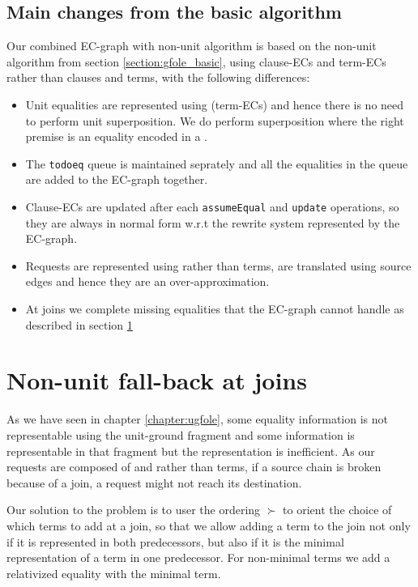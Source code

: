 \bigskip 

\subsection*{Main changes from the basic algorithm}
Our combined EC-graph with non-unit algorithm is based on the non-unit algorithm from section \ref{section:gfole_basic}, using clause-ECs and term-ECs rather than clauses and terms, with the following differences:
\begin{itemize}
	\item Unit equalities are represented using \GTs{} (term-ECs) and hence there is no need to perform unit superposition. 
	We do perform superposition where the right premise is an equality encoded in a \GT{}.
	\item The \lstinline|todoeq| queue is maintained seprately and all the equalities in the queue are added to the EC-graph together.
	\item Clause-ECs are updated after each \lstinline|assumeEqual| and \lstinline|update| operations, so they are always in normal form w.r.t the rewrite system represented by the EC-graph.
	\item Requests are represented using \GFAs{} rather than terms, are translated using source edges and hence they are an over-approximation.
	\item At joins we complete missing equalities that the EC-graph cannot handle as described in section \ref{section:gfole:EC-graphs:non_unit_fallback}
\end{itemize}

\section{Non-unit fall-back at joins}\label{section:gfole:EC-graphs:non_unit_fallback}
As we have seen in chapter \ref{chapter:ugfole}, some equality information is not representable using the unit-ground fragment and some information is representable in that fragment but the representation is inefficient. As our requests are composed of \GFAs{} and \GTs{} rather than terms, if a source chain is broken because of a join, a request might not reach its destination.

Our solution to the problem is to user the ordering $\succ$ to orient the choice of which terms to add at a join, so that we allow adding a term to the join not only if it is represented in both predecessors, but also if it is the minimal representation of a term in one predecessor. For non-minimal terms we add a relativized equality with the minimal term.

